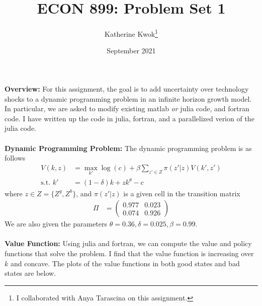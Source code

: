 \documentclass[12pt]{article}
\title{ECON 899: Problem Set 1}
\author{Katherine Kwok\footnote{I collaborated with Anya Tarascina on this assignment.}}
\date{September 2021}
\begin{document}
\maketitle
\noindent \textbf{Overview: } For this assignment, the goal is to add uncertainty over technology shocks to a dynamic programming problem in an infinite horizon growth model. In particular, we are asked to modify existing matlab \textit{or} julia code, and fortran code. I have written up the code in julia, fortran, and a parallelized verion of the julia code. \\\\
\textbf{Dynamic Programming Problem: } The dynamic programming problem is as follows
\begin{align*}
    V(k, z) &= \max_{k'} \log(c) + \beta \sum_{z' \in Z} \pi(z'|z) V(k', z') \\
    \text{s.t. } k' &= (1-\delta)k + zk^{\theta} - c
\end{align*}
where $z \in Z = \{Z^g, Z^b\}$, and $\pi(z'|z)$ is a given cell in the transition matrix 
\begin{align*}
    \Pi &= \begin{pmatrix} 0.977 & 0.023 \\ 0.074 & 0.926\end{pmatrix}
\end{align*}
We are also given the parameters $\theta = 0.36, \delta = 0.025, \beta = 0.99$.\\\\
\textbf{Value Function: }Using julia and fortran, we can compute the value and policy functions that solve the problem. I find that the value function is increasing over $k$ and concave. The plots of the value functions in both good states and bad states are below.
\end{document}
